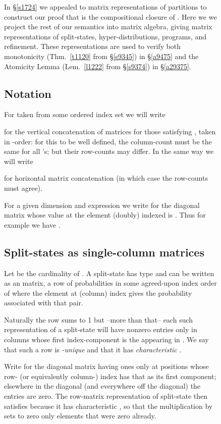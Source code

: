 \documentclass[runningheads]{llncs}
\newcommand\Sec[1] {Sec.~\ref{#1}}
\newcommand\App[1] {App.~\ref{#1}}
\renewcommand\Sec[1] {\S\ref{#1}}
\renewcommand\App[1] {\S\ref{#1}}
\newenvironment{Figure}[2][t]{\begin{figure}[#1]\def\Label{#2}\small}{\label{\Label}\end{figure}}
\newcommand\Thm[1] {Thm.~\ref{#1}}
\newcommand\Lem[1] {Lem.~\ref{#1}}
\begin{document}
\begin{Figure}[ht!]{f1228}
In \Sec{s1724} we appealed to matrix representations of partitions to construct our proof that  is the compositional closure of . Here we we project the rest of our semantics into matrix algebra, giving matrix representations of split-states, hyper-distributions, programs, and refinement. These representations are used to verify both monotonicity (\Thm{t1120} from \Sec{s9345}) in \App{a9475} and the Atomicity Lemma (\Lem{l1222} from \Sec{s9374}) in \App{a29375}.

\subsection{Notation}

For  taken from some ordered index set  we will write 
 
for the vertical concatenation of matrices  for those  satisfying , taken in -order: for this to be well defined, the column-count must be the same for all 's; but their row-counts may differ.  In the same way we will write 
 
for horizontal matrix concatenation (in which case the row-counts must agree).

For a given dimension  and expression  we write  for the  diagonal matrix whose value at the element (doubly) indexed  is . Thus for example we have .

\subsection{Split-states as single-column matrices}

Let  be the cardinality of . A split-state has type  and can be written as an  matrix, a row of probabilities in some agreed-upon index order of  where the element at (column) index  gives the probability  associated with that pair.

Naturally the row sums to 1 but --more than that-- each such representation of a split-state will have nonzero entries only in columns whose first index-component is the  appearing in . We say that such a row is \emph{-unique} and that it has \emph{characteristic} .

Write  for the  diagonal matrix  having ones only at positions whose row- (or equivalently column-) index has that  as its first component; elsewhere in the diagonal (and everywhere off the diagonal) the entries are zero. The row-matrix representation  of split-state  then satisfies  because it has characteristic , so that the multiplication by  sets to zero only elements that were zero already.



\end{Figure}
\end{document}
